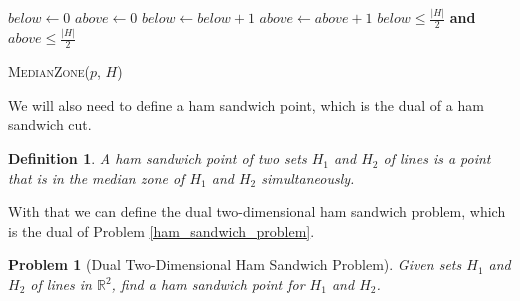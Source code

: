 \documentclass{article}
\renewcommand{\And}{\textbf{and} }
\def\realnumbers{\mathbb{R}}
\newtheorem{definition}{Definition}
\newtheorem{problem}{Problem}
\newcommand{\RR}{\realnumbers}
\begin{document}
\begin{algorithm}
\begin{algorithmic}[1]
    
    \State $below \gets 0$
    \State $above \gets 0$
         $below \gets below + 1$
        \EndIf
         $above \gets above + 1$
        \EndIf
    \EndFor
    \State \Return $below \leq \frac{|H|}{2}$ \And $above \leq \frac{|H|}{2}$
    \end{algorithmic}
    \caption{\textsc{MedianZone}($p$, $H$)}
    \label{median_zone}
\end{algorithm}

We will also need to define a ham sandwich point, which is the dual of a ham sandwich cut.
    
\begin{definition}\label{ham_sandwich_point_definition}
  A ham sandwich point of two sets $H_1$ and $H_2$ of lines is a point that is in the median zone of $H_1$ and $H_2$ simultaneously.
\end{definition}

With that we can define the dual two-dimensional ham sandwich problem, which is the dual of Problem \ref{ham_sandwich_problem}.
  
\begin{problem}[Dual Two-Dimensional Ham Sandwich Problem]\label{dual_ham_sandwich_problem}
  Given sets $H_1$ and $H_2$ of lines in $\RR^2$, find a ham sandwich point for $H_1$ and $H_2$. 
\end{problem}
\end{document}
